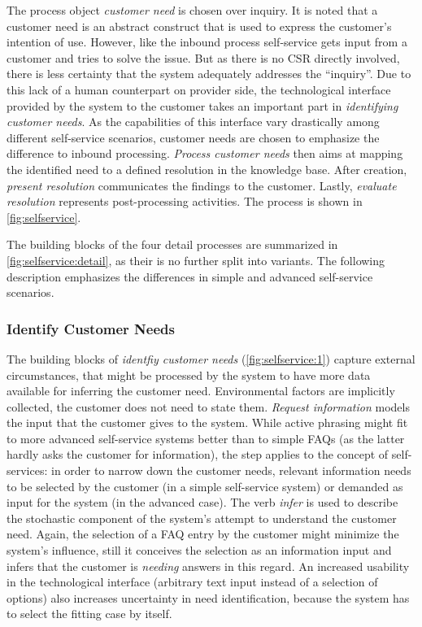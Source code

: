 	 The process object \textit{customer need} is chosen over inquiry. It is noted that a customer need is an abstract construct that is used to express the customer's intention of use. However, like the inbound process self-service gets input from a customer and tries to solve the issue. But as there is no \acrshort{CSR} directly involved, there is less certainty that the system adequately addresses the \enquote{inquiry}. Due to this lack of a human counterpart on provider side, the technological interface provided by the system to the customer takes an important part in \textit{identifying customer needs}. As the capabilities of this interface vary drastically among different self-service scenarios, customer needs are chosen to emphasize the difference to inbound processing. \textit{Process customer needs} then aims at mapping the identified need to a defined resolution in the knowledge base. After creation, \textit{present resolution} communicates the findings to the customer. Lastly, \textit{evaluate resolution} represents post-processing activities. The process is shown in \Fig \ref{fig:selfservice}.
	 
	 The building blocks of the four detail processes are summarized in \Fig \ref{fig:selfservice:detail}, as their is no further split into variants. The following description emphasizes the differences in simple and advanced self-service scenarios. 
	 
	 \subsubsection{Identify Customer Needs}
	 The building blocks of \textit{identfiy customer needs} (\Fig \ref{fig:selfservice:1}) capture external circumstances, that might be processed by the system to have more data available for inferring the customer need. Environmental factors are implicitly collected, \ie the customer does not need to state them. \textit{Request information} models the input that the customer gives to the system. While active phrasing might fit to more advanced self-service systems better than to simple \acrshort{FAQ}s (as the latter hardly asks the customer for information), the step applies to the concept of self-services: in order to narrow down the customer needs, relevant information needs to be selected by the customer (in a simple self-service system) or demanded as input for the system (in the advanced case). The verb \textit{infer} is used to describe the stochastic component of the system's attempt to understand the customer need. Again, the selection of a \acrshort{FAQ} entry by the customer might minimize the system's influence, still it conceives the selection as an information input and infers that the customer is \textit{needing} answers in this regard. An increased usability in the technological interface (arbitrary text input instead of a selection of options) also increases uncertainty in need identification, because the system has to select the fitting case by itself. 
